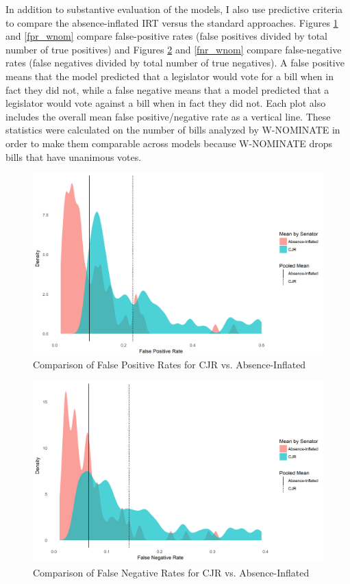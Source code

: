 In addition to substantive evaluation of the models, I also use predictive criteria to compare the absence-inflated IRT versus the standard approaches. Figures \ref{fpr_cjr} and \ref{fpr_wnom} compare false-positive rates (false positives divided by total number of true positives) and Figures \ref{fnr_cjr} and \ref{fnr_wnom} compare false-negative rates (false negatives divided by total number of true negatives). A false positive means that the model predicted that a legislator would vote for a bill when in fact they did not, while a false negative means that a model predicted that a legislator would vote against a bill when in fact they did not. Each plot also includes the overall mean false positive/negative rate as a vertical line. These statistics were calculated on the number of bills analyzed by W-NOMINATE in order to make them comparable across models because W-NOMINATE drops bills that have unanimous votes. 
\begin{figure}[h!]
	\caption{Comparison of False Positive Rates for CJR vs. Absence-Inflated}\label{fpr_cjr}
	\includegraphics[width=0.9\linewidth]{false_positive_CJR_sen}
\end{figure}
\begin{figure}[h!]
	\caption{Comparison of False Negative Rates for CJR vs. Absence-Inflated}\label{fnr_cjr}
		\includegraphics[width=0.9\linewidth]{false_negative_CJR_sen}
\end{figure}
